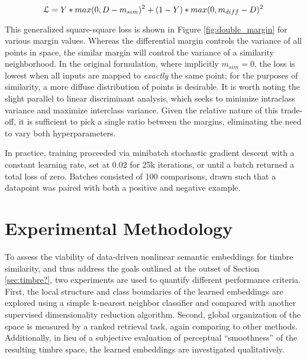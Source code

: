 \begin{equation}
\mathcal{L} = Y * max(0, D - m_{sim})^2 + (1 - Y) * max(0, m_{diff} - D)^2 \\
\end{equation}

This generalized square-square loss is shown in Figure \ref{fig:double_margin} for various margin values.
Whereas the differential margin controls the variance of all points in space, the similar margin will control the variance of a similarity neighborhood.
In the original formulation, where implicitly $m_{sim} = 0$, the loss is lowest when all inputs are mapped to \emph{exactly} the same point; for the purposes of similarity, a more diffuse distribution of points is desirable.
It is worth noting the slight parallel to linear discriminant analysis, which seeks to minimize intraclass variance and maximize interclass variance.
Given the relative nature of this trade-off, it is sufficient to pick a single ratio between the margins, eliminating the need to vary both hyperparameters.


In practice, training proceeded via minibatch stochastic gradient descent with a constant learning rate, set at 0.02 for 25k iterations, or until a batch returned a total loss of zero.
Batches consisted of 100 comparisons, drawn such that a datapoint was paired with both a positive and negative example.


\section{Experimental Methodology}
\label{sec:example}


To assess the viability of data-driven nonlinear semantic embeddings for timbre similarity, and thus address the goals outlined at the outset of Section \ref{sec:timbre?}, two experiments are used to quantify different performance criteria.
First, the local structure and class boundaries of the learned embeddings are explored using a simple k-nearest neighbor classifier and compared with another supervised dimensionality reduction algorithm.
Second, global organization of the space is measured by a ranked retrieval task, again comparing to other methods.
Additionally, in lieu of a subjective evaluation of perceptual ``smoothness'' of the resulting timbre space, the learned embeddings are investigated qualitatively.

